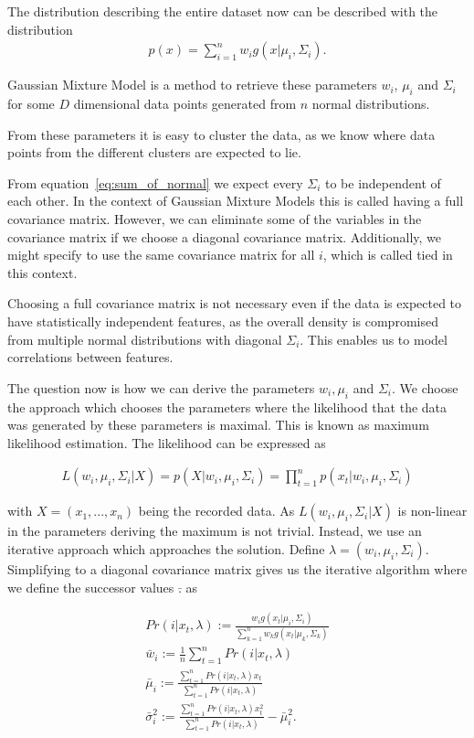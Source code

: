 The distribution describing the entire dataset now can be described with the distribution
\begin{align}
	\label{eq:sum_of_normal}
	p(x) = \sum_{i=1}^{n} w_i g(x|\mu_i, \Sigma_i).
\end{align}

Gaussian Mixture Model is a method to retrieve these parameters $w_i$, $\mu_i$ and $\Sigma_i$ for some $D$ dimensional data points generated from $n$ normal distributions.

From these parameters it is easy to cluster the data, as we know where data points from the different clusters are expected to lie.

From equation~\ref{eq:sum_of_normal} we expect every $\Sigma_i$ to be independent of each other. In the context of Gaussian Mixture Models this is called having a full covariance matrix. However, we can eliminate some of the variables in the covariance matrix if we choose a diagonal covariance matrix. Additionally, we might specify to use the same covariance matrix for all $i$, which is called tied in this context.

Choosing a full covariance matrix is not necessary even if the data is expected to have statistically independent features, as the overall density is compromised from multiple normal distributions with diagonal $\Sigma_i$. This enables us to model correlations between features.

The question now is how we can derive the parameters $w_i, \mu_i$ and $\Sigma_i$. We choose the approach which chooses the parameters where the likelihood that the data was generated by these parameters is maximal. This is known as maximum likelihood estimation. The likelihood can be expressed as

\begin{align*}
	L(w_i, \mu_i, \Sigma_i|X) = p(X|w_i, \mu_i, \Sigma_i) = \prod_{t=1}^n p(x_t|w_i, \mu_i, \Sigma_i)
\end{align*}

with $X = (x_1, ..., x_n)$ being the recorded data. As $L(w_i, \mu_i, \Sigma_i|X)$ is non-linear in the parameters deriving the maximum is not trivial. Instead, we use an iterative approach which approaches the solution. Define $\lambda = (w_i, \mu_i, \Sigma_i)$. Simplifying to a diagonal covariance matrix gives us the iterative algorithm where we define the successor values $\bar{.}$ as

\begin{align*}
	Pr(i | x_t, \lambda) := \frac{w_i g(x_t | \mu_i, \Sigma_i)}{\sum_{k=1}^{n} w_k g(x_t | \mu_k, \Sigma_k)}\\
	\bar{w}_i := \frac{1}{n} \sum_{t=1}^{n} Pr(i | x_t, \lambda)\\
	\bar{\mu}_i := \frac{\sum_{t=1}^{n} Pr(i | x_t, \lambda) x_t}{\sum_{t=1}^{n} Pr(i | x_t, \lambda)}\\
	\bar{\sigma}_i^2 := \frac{\sum_{t=1}^{n} Pr(i | x_t, \lambda) x_t^2}{\sum_{t=1}^{n} Pr(i | x_t, \lambda)} - \bar{\mu}_i^2.
\end{align*}

